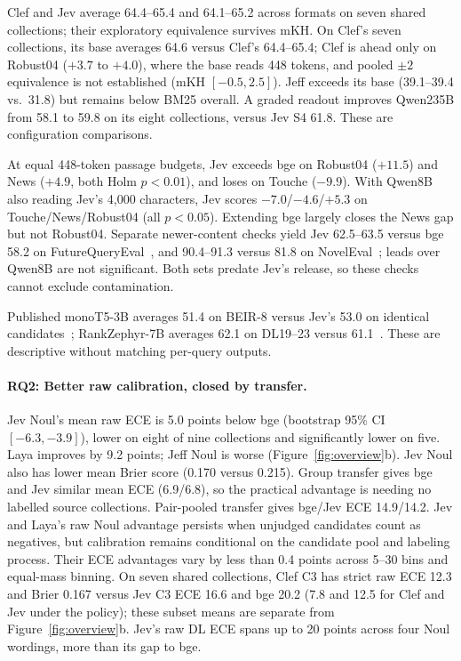\documentclass[sigconf,nonacm]{acmart}
\begin{document}
Clef and Jev average 64.4--65.4 and 64.1--65.2 across formats on seven shared collections; their exploratory equivalence survives mKH. On Clef's seven collections, its base averages 64.6 versus Clef's 64.4--65.4; Clef is ahead only on Robust04 ($+3.7$ to $+4.0$), where the base reads 448 tokens, and pooled $\pm2$ equivalence is not established (mKH $[-0.5,2.5]$). Jeff exceeds its base (39.1--39.4 vs.\ 31.8) but remains below BM25 overall. A graded readout improves Qwen235B from 58.1 to 59.8 on its eight collections, versus Jev S4 61.8. These are configuration comparisons.

At equal 448-token passage budgets, Jev exceeds bge on Robust04 ($+11.5$) and News ($+4.9$, both Holm $p<0.01$), and loses on Touche ($-9.9$). With Qwen8B also reading Jev's 4,000 characters, Jev scores $-7.0$/$-4.6$/$+5.3$ on Touche/News/Robust04 (all $p<0.05$). Extending bge largely closes the News gap but not Robust04. Separate newer-content checks yield Jev 62.5--63.5 versus bge 58.2 on FutureQueryEval~\cite{abdallah2025futurequery}, and 90.4--91.3 versus 81.8 on NovelEval~\cite{sun2023rankgpt}; leads over Qwen8B are not significant. Both sets predate Jev's release, so these checks cannot exclude contamination.

Published monoT5-3B averages 51.4 on BEIR-8 versus Jev's 53.0 on identical candidates~\cite{nogueira2020monot5,sun2023rankgpt}; RankZephyr-7B averages 62.1 on DL19--23 versus 61.1~\cite{rankllm,pradeep2023rankzephyr}. These are descriptive without matching per-query outputs.

\paragraph{RQ2: Better raw calibration, closed by transfer.}
Jev Noul's mean raw ECE is 5.0 points below bge (bootstrap 95\% CI $[-6.3,-3.9]$), lower on eight of nine collections and significantly lower on five. Laya improves by 9.2 points; Jeff Noul is worse (Figure~\ref{fig:overview}b). Jev Noul also has lower mean Brier score (0.170 versus 0.215). Group transfer gives bge and Jev similar mean ECE (6.9/6.8), so the practical advantage is needing no labelled source collections. Pair-pooled transfer gives bge/Jev ECE 14.9/14.2. Jev and Laya's raw Noul advantage persists when unjudged candidates count as negatives, but calibration remains conditional on the candidate pool and labeling process. Their ECE advantages vary by less than 0.4 points across 5--30 bins and equal-mass binning. On seven shared collections, Clef C3 has strict raw ECE 12.3 and Brier 0.167 versus Jev C3 ECE 16.6 and bge 20.2 (7.8 and 12.5 for Clef and Jev under the policy); these subset means are separate from Figure~\ref{fig:overview}b. Jev's raw DL ECE spans up to 20 points across four Noul wordings, more than its gap to bge.
\end{document}
